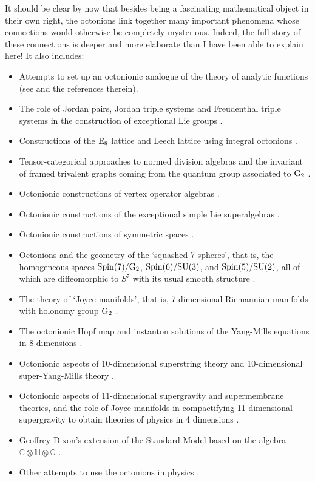 \documentclass[12pt]{article}
\newcommand\C{{\mathbb C}}
\renewcommand\H{{\mathbb H}}
\renewcommand\O{{\mathbb O}}
\newcommand{\SU}{{\rm SU}}
\newcommand{\Spin}{{\rm Spin}}
\newcommand{\E}{{\rm E}}
\newcommand{\G}{{\rm G}}
\newcommand{\tensor}{\otimes}
\begin{document}
It should be clear by now that besides being a fascinating mathematical
object in their own right, the octonions link together many important
phenomena whose connections would otherwise be completely mysterious.  
Indeed, the full story of these connections is deeper and more elaborate
than I have been able to explain here!   It also includes:
\begin{itemize} 
\item Attempts to set up an octonionic analogue of the theory of 
analytic functions (see \cite{GT} and the references therein). 
\item The role of Jordan pairs, Jordan triple systems and 
Freudenthal triple systems in the construction of exceptional Lie groups 
\cite{Brown,Faulkner,FF,GKN,GT,McCrimmon,Meyberg}.
\item Constructions of the $\E_8$ lattice and Leech lattice using
integral octonions \cite{Coxeter,EG}.
\item Tensor-categorical approaches to normed division algebras
and the invariant of framed trivalent graphs coming from the
quantum group associated to $\G_2$ \cite{Boos,Bremner,Kuperberg,Rost}.
\item Octonionic constructions of vertex operator algebras \cite{FFrenkel}. 
\item Octonionic constructions of the exceptional simple Lie superalgebras 
\cite{Sudbery2}. 
\item Octonionic constructions of symmetric spaces \cite{Besse}.
\item Octonions and the geometry of the `squashed 7-spheres', that is, 
the homogeneous spaces $\Spin(7)/\G_2$, $\Spin(6)/\SU(3)$, and 
$\Spin(5)/\SU(2)$, all of which are diffeomorphic to $S^7$ with its 
usual smooth structure \cite{CD}. 
\item The theory of `Joyce manifolds', that is, 7-dimensional Riemannian 
manifolds with holonomy group $\G_2$ \cite{Joyce}. 
\item The octonionic Hopf map and instanton solutions 
of the Yang-Mills equations in 8 dimensions \cite{GKS}. 
\item Octonionic aspects of 10-dimensional superstring theory and 
10-dimensional super-Yang-Mills theory 
\cite{CH,Deligne,Evans,KT,Schray,Sierra}.
\item Octonionic aspects of 11-dimensional supergravity and supermembrane 
theories, and the role of Joyce manifolds in compactifying 11-dimensional 
supergravity to obtain theories of physics in 4 dimensions \cite{Duff}. 
\item Geoffrey Dixon's extension of the Standard Model based on the
algebra $\C \tensor \H \tensor \O$ \cite{Dixon}.  
\item Other attempts to use the octonions in physics 
\cite{CMT,GT,LPS,Okubo}.
\end{itemize}  
\end{document}
